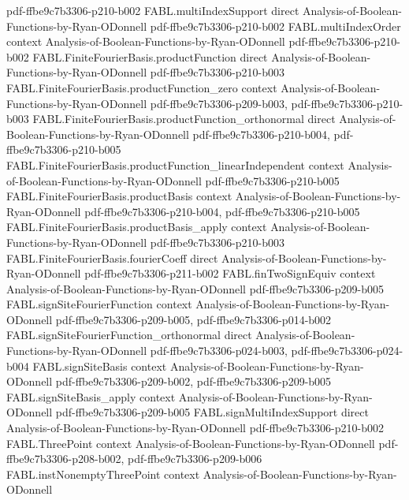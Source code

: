 \begin{theorem}
  {pdf-ffbe9c7b3306-p210-b002}
\proofstep
  {FABL.multiIndexSupport}
  {direct}
  {Analysis-of-Boolean-Functions-by-Ryan-ODonnell}
  {pdf-ffbe9c7b3306-p210-b002}
\proofstep
  {FABL.multiIndexOrder}
  {context}
  {Analysis-of-Boolean-Functions-by-Ryan-ODonnell}
  {pdf-ffbe9c7b3306-p210-b002}
\proofstep
  {FABL.FiniteFourierBasis.productFunction}
  {direct}
  {Analysis-of-Boolean-Functions-by-Ryan-ODonnell}
  {pdf-ffbe9c7b3306-p210-b003}
\proofstep
  {FABL.FiniteFourierBasis.productFunction_zero}
  {context}
  {Analysis-of-Boolean-Functions-by-Ryan-ODonnell}
  {pdf-ffbe9c7b3306-p209-b003,
    pdf-ffbe9c7b3306-p210-b003}
\proofstep
  {FABL.FiniteFourierBasis.productFunction_orthonormal}
  {direct}
  {Analysis-of-Boolean-Functions-by-Ryan-ODonnell}
  {pdf-ffbe9c7b3306-p210-b004,
    pdf-ffbe9c7b3306-p210-b005}
\proofstep
  {FABL.FiniteFourierBasis.productFunction_linearIndependent}
  {context}
  {Analysis-of-Boolean-Functions-by-Ryan-ODonnell}
  {pdf-ffbe9c7b3306-p210-b005}
\proofstep
  {FABL.FiniteFourierBasis.productBasis}
  {context}
  {Analysis-of-Boolean-Functions-by-Ryan-ODonnell}
  {pdf-ffbe9c7b3306-p210-b004,
    pdf-ffbe9c7b3306-p210-b005}
\proofstep
  {FABL.FiniteFourierBasis.productBasis_apply}
  {context}
  {Analysis-of-Boolean-Functions-by-Ryan-ODonnell}
  {pdf-ffbe9c7b3306-p210-b003}
\proofstep
  {FABL.FiniteFourierBasis.fourierCoeff}
  {direct}
  {Analysis-of-Boolean-Functions-by-Ryan-ODonnell}
  {pdf-ffbe9c7b3306-p211-b002}
\proofstep
  {FABL.finTwoSignEquiv}
  {context}
  {Analysis-of-Boolean-Functions-by-Ryan-ODonnell}
  {pdf-ffbe9c7b3306-p209-b005}
\proofstep
  {FABL.signSiteFourierFunction}
  {context}
  {Analysis-of-Boolean-Functions-by-Ryan-ODonnell}
  {pdf-ffbe9c7b3306-p209-b005,
    pdf-ffbe9c7b3306-p014-b002}
\proofstep
  {FABL.signSiteFourierFunction_orthonormal}
  {direct}
  {Analysis-of-Boolean-Functions-by-Ryan-ODonnell}
  {pdf-ffbe9c7b3306-p024-b003,
    pdf-ffbe9c7b3306-p024-b004}
\proofstep
  {FABL.signSiteBasis}
  {context}
  {Analysis-of-Boolean-Functions-by-Ryan-ODonnell}
  {pdf-ffbe9c7b3306-p209-b002,
    pdf-ffbe9c7b3306-p209-b005}
\proofstep
  {FABL.signSiteBasis_apply}
  {context}
  {Analysis-of-Boolean-Functions-by-Ryan-ODonnell}
  {pdf-ffbe9c7b3306-p209-b005}
\proofstep
  {FABL.signMultiIndexSupport}
  {direct}
  {Analysis-of-Boolean-Functions-by-Ryan-ODonnell}
  {pdf-ffbe9c7b3306-p210-b002}
\proofstep
  {FABL.ThreePoint}
  {context}
  {Analysis-of-Boolean-Functions-by-Ryan-ODonnell}
  {pdf-ffbe9c7b3306-p208-b002,
    pdf-ffbe9c7b3306-p209-b006}
\proofstep
  {FABL.instNonemptyThreePoint}
  {context}
  {Analysis-of-Boolean-Functions-by-Ryan-ODonnell}

\end{theorem}
